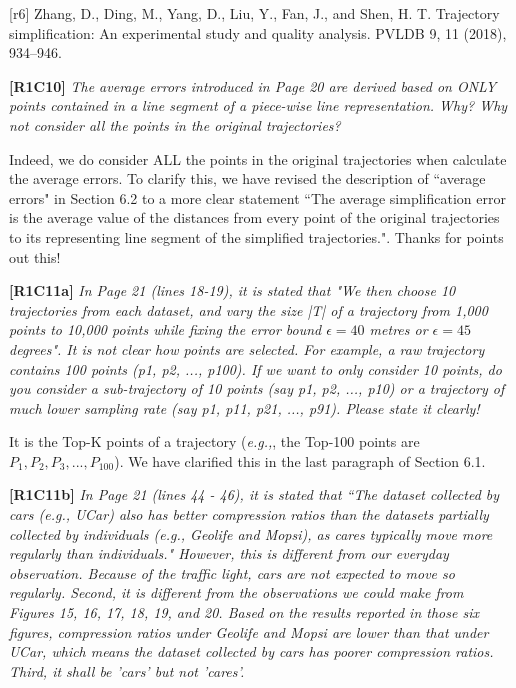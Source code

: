 \documentclass{letter}
\newcommand{\eg}{\emph{e.g.,}\xspace}
\begin{document}
{[r6] Zhang, D., Ding, M., Yang, D., Liu, Y., Fan, J., and Shen, H. T. Trajectory simplification: An experimental study and quality analysis. PVLDB 9, 11 (2018), 934–946.

\textbf{[R1C10]} \emph{The average errors introduced in Page 20 are derived based on ONLY points contained in a line segment of a piece-wise line representation. Why? Why not consider all the points in the original trajectories? }

Indeed, we do consider ALL the points in the original trajectories when calculate the average errors. To clarify this, we have revised the description of ``average errors" in Section 6.2 to a more clear statement ``{The average simplification error is the average value of the distances from every point of the original trajectories to its representing line segment of the simplified trajectories.}". Thanks for points out this!


\textbf{[R1C11a]} \emph{ In Page 21 (lines 18-19), it is stated that "We then choose 10 trajectories from each dataset, and vary the size |T| of a trajectory from 1,000 points to 10,000 points while fixing the error bound $\epsilon = 40$ metres or $\epsilon = 45$ degrees". It is not clear how points are selected. For example, a raw trajectory contains 100 points (p1, p2, ..., p100). If we want to only consider 10 points, do you consider a sub-trajectory of 10 points (say p1, p2, ..., p10) or a trajectory of much lower sampling rate (say p1, p11, p21, ..., p91). Please state it clearly!}

It is the Top-K points of a trajectory (\eg, the Top-100 points are $P_1, P_2, P_3, ..., P_{100}$). We have clarified this in the last paragraph of Section 6.1.

\textbf{[R1C11b]} \emph{ In Page 21 (lines 44 - 46), it is stated that ``The dataset collected by cars (e.g., UCar) also has better compression ratios than the datasets partially collected by individuals (e.g., Geolife and Mopsi), as cares typically move more regularly than individuals." However, this is different from our everyday observation. Because of the traffic light, cars are not expected to move so regularly. Second, it is different from the observations we could make from Figures 15, 16, 17, 18, 19, and 20. Based on the results reported in those six figures, compression ratios under Geolife and Mopsi are lower than that under UCar, which means the dataset collected by cars has poorer compression ratios. Third, it shall be 'cars' but not 'cares'. }


}
\end{document}
